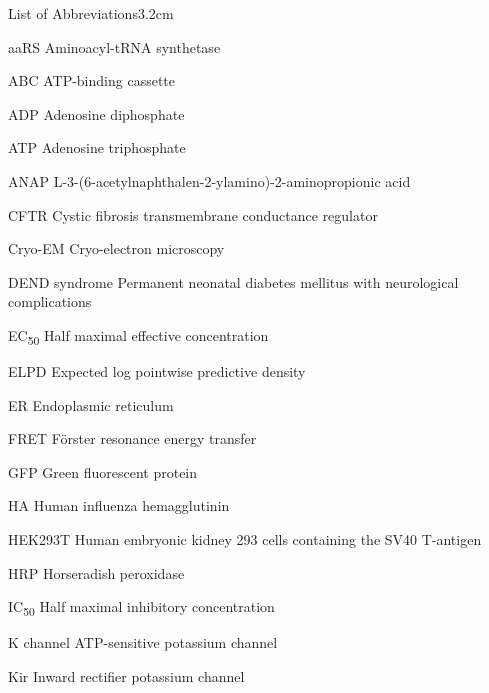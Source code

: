 \graphicspath{{figures/appendix/}}

\begin{mclistof}{List of Abbreviations}{3.2cm}

\item[aaRS] Aminoacyl-tRNA synthetase

\item[ABC] ATP-binding cassette

\item[ADP] Adenosine diphosphate

\item[ATP] Adenosine triphosphate

\item[ANAP] L-3-(6-acetylnaphthalen-2-ylamino)-2-aminopropionic acid

\item[CFTR] Cystic fibrosis transmembrane conductance regulator

\item[Cryo-EM] Cryo-electron microscopy

\item[DEND syndrome] Permanent neonatal diabetes mellitus with neurological complications

\item[EC\textsubscript{50}] Half maximal effective concentration

\item[ELPD] Expected log pointwise predictive density

\item[ER] Endoplasmic reticulum

\item[FRET] F\"{o}rster resonance energy transfer

\item[GFP] Green fluorescent protein

\item[HA] Human influenza hemagglutinin

\item[HEK293T] Human embryonic kidney 293 cells containing the SV40 T-antigen

\item[HRP] Horseradish peroxidase

\item[IC\textsubscript{50}] Half maximal inhibitory concentration

\item[K\ATP{} channel] ATP-sensitive potassium channel

\item[Kir] Inward rectifier potassium channel


\end{mclistof}
